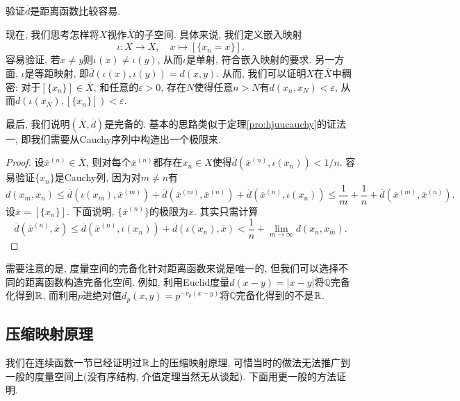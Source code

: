 验证$\overline{d}$是距离函数比较容易. 

现在, 我们思考怎样将$X$视作$\overline{X}$的子空间. 具体来说, 我们定义嵌入映射$$\iota : X \to \overline{X},\quad x \mapsto [\{ x_n=x \}]. $$
容易验证, 若$x\neq y$则$\iota (x) \neq \iota (y)$, 从而$\iota$是单射, 符合嵌入映射的要求. 另一方面, $\iota$是等距映射, 即$\overline{d} (\iota (x),\iota (y)) = d(x,y)$. 从而, 我们可以证明$X$在$\overline{X}$中稠密: 对于$[\{ x_n \}] \in \overline{X}$, 和任意的$\varepsilon >0$, 存在$N$使得任意$n>N$有$d(x_n,x_N)<\varepsilon$, 从而$\overline{d} (\iota (x_N),[\{ x_n \}]) < \varepsilon$. 

最后, 我们说明$(\overline{X}, \overline{d})$是完备的. 基本的思路类似于定理\ref{pro:hjuucauchy}的证法一, 即我们需要从Cauchy序列中构造出一个极限来. 

\begin{proof}
	设$\overline{x}^{(n)} \in \overline{X}$, 则对每个$\overline{x}^{(n)}$都存在$x_n \in X$使得$\overline{d}(\overline{x}^{(n)},\iota (x_n))<1/n$. 容易验证$\{ x_n \}$是Cauchy列, 因为对$m \neq n$有$$d(x_m,x_n) \leq \overline{d} (\iota (x_m), \overline{x}^{(m)}) + \overline{d} (\overline{x}^{(m)}, \overline{x}^{(n)}) + \overline{d} (\overline{x}^{(n)}, \iota (x_n)) \leq \frac{1}{m} + \frac{1}{n} + \overline{d} (\overline{x}^{(m)}, \overline{x}^{(n)}). $$
	设$\overline{x} = [\{ x_n \}]$. 下面说明, $\{ \overline{x}^{(n)} \}$的极限为$\overline{x}$. 其实只需计算$$\overline{d} (\overline{x}^{(n)} , \overline{x}) \leq \overline{d}(\overline{x}^{(n)},\iota (x_n)) + \overline{d}(\iota (x_n),\overline{x}) < \frac{1}{n} + \lim_{m\to \infty} d(x_n,x_m). $$
\end{proof}

需要注意的是, 度量空间的完备化针对距离函数来说是唯一的, 但我们可以选择不同的距离函数构造完备化空间. 例如, 利用Euclid度量$d(x-y)=|x-y|$将$\mathbb{Q}$完备化得到$\mathbb{R}$, 而利用$p$进绝对值$d_p(x,y) = p^{-v_p(x-y)}$将$\mathbb{Q}$完备化得到的不是$\mathbb{R}$. 

\subsection{压缩映射原理}

我们在连续函数一节已经证明过$\mathbb{R}$上的压缩映射原理, 可惜当时的做法无法推广到一般的度量空间上(没有序结构, 介值定理当然无从谈起). 下面用更一般的方法证明. 

